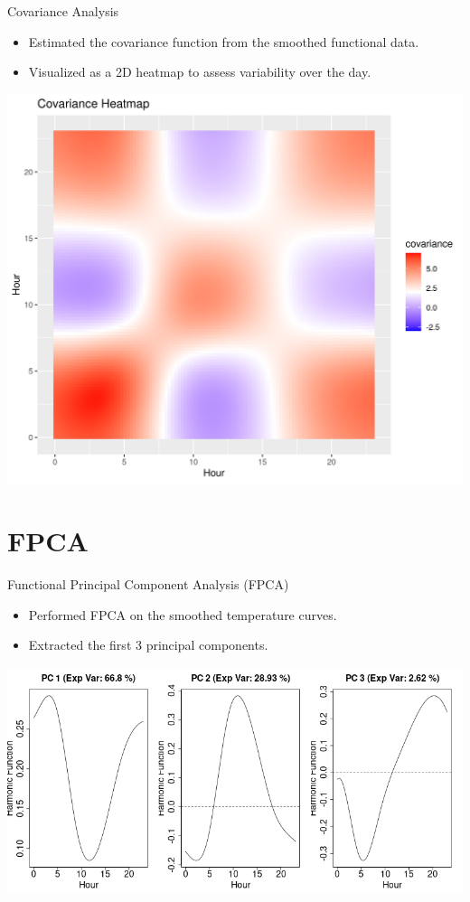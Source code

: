 \documentclass[svgnames, 12pt]{beamer}
\begin{document}
\begin{frame}{Covariance Analysis}
		\begin{itemize}
		\item Estimated the covariance function from the smoothed functional data.
		\item Visualized as a 2D heatmap to assess variability over the day.
	\end{itemize}
	\begin{center}
		\includegraphics[width=0.6\linewidth]{../notebooks/assets/covariance_heatmap.png}
	\end{center}
\end{frame}

\section{FPCA}

\begin{frame}{Functional Principal Component Analysis (FPCA)}
	\begin{itemize}
		\item Performed FPCA on the smoothed temperature curves.
		\item Extracted the first 3 principal components.
	\end{itemize}
	\begin{center}
		\includegraphics[width=0.8\linewidth]{../notebooks/assets/pca_scree_plot.png}
	\end{center}
\end{frame}
\end{document}
